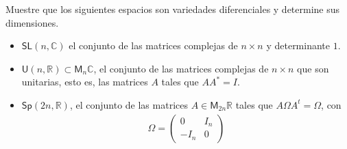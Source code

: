 \documentclass[11pt]{article}
\title{\paint{purple}{Geometr\'ia Diferencial}}
\author{\paint{purple}{Guido Arnone}}
\date{}
\newcommand{\R}{\mathbb{R}}
\newcommand{\C}{\mathbb{C}}
\newcommand{\M}[2]{\mathsf{M}_{#1}#2}
\newcommand{\paint}[2]{\color{#1}{#2}}
\newenvironment{exercise}[2][Ejercicio]{\begin{trivlist}
\item[\hskip \labelsep \paint{purple}{{\bfseries #1}}\hskip \labelsep {\bfseries #2.}]}{\end{trivlist}}
\begin{document}
\maketitle

\begin{exercise}{5} Muestre que los siguientes espacios son variedades diferenciales y determine sus
dimensiones. 
\begin{itemize}
\item[(i)] $\mathsf{SL}(n,\C)$ el conjunto de las matrices complejas de $n \times n$ y determinante $1$.
\item[(ii)] $\mathsf{U}(n,\R) \subset \M{n}{\C}$, el conjunto de las matrices complejas de $n \times n$ que son unitarias, esto es, las matrices $A$ tales que $AA^* = I$.
\item[(iii)] $\mathsf{Sp}(2n,\R)$, el conjunto de las matrices $A \in \mathsf{M}_{2n}\R$ tales que $A\Omega A^t=\Omega$, con
\begin{align*}
  \Omega=\begin{pmatrix}0&I_n\\-I_n&0\end{pmatrix}
\end{align*}
\end{itemize}
\end{exercise}
\end{document}
